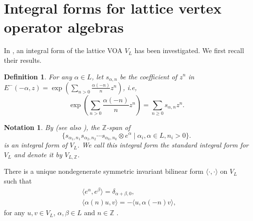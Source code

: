 \documentclass[12pt]{article}
\def\labtt#1{\label {#1} }
\def\ZZ{{\mathbb Z}}
\newtheorem{de}[thm]{Definition}
\newtheorem{nota}[thm]{Notation}
\begin{document}
\section{Integral forms for lattice vertex operator algebras}\label{sec:2}




In \cite{borcherds,ivoa,Pro}, an integral form of the lattice VOA $V_L$ has been investigated. We first recall their results.


\begin{de}\label{de_san}
For any $\alpha \in L$, let $s_{\alpha, n}$ be the coefficient of $z^n$ in\\
$E^-(-\alpha, z) = \exp( \sum_{n>0} \frac{\alpha(-n)}{n} z^n)$, i.e,
\[
\exp\left( \sum_{n>0} \frac{\alpha(-n)}{n} z^n\right) = \sum_{n\geq 0} s_{\alpha,n}z^n.
\]
\end{de}

\begin{nota}\labtt{standardif}
By \cite[Theorem 3.3]{ivoa} (see also \cite[Section 4.4]{Pro}),
the $\ZZ$-span of
\[
\{ s_{\alpha_1,n_1}s_{\alpha_2,n_2} \cdots s_{\alpha_k,n_k}\otimes e^\alpha \mid \alpha_i, \alpha\in L , n_i >0\}.
\]
is an integral form of $V_L$.  We call this integral form the standard integral form for $V_L$ and denote it by $V_{L,\ZZ}$.
\end{nota}


There is a unique nondegenerate symmetric invariant bilinear form $\langle \cdot, \cdot\rangle$ on $V_L$ such that 
\[
\begin{split}
&\langle e^\alpha, e^\beta \rangle =\delta_{\alpha+\beta,0}, \\
&\langle \alpha(n)u, v\rangle = -\langle u, \alpha(-n)v\rangle, 
\end{split}
\]
for any $u,v\in V_L$, $\alpha, \beta\in L$ and $n\in \ZZ$ \cite{FLM}. 

\medskip
\end{document}

